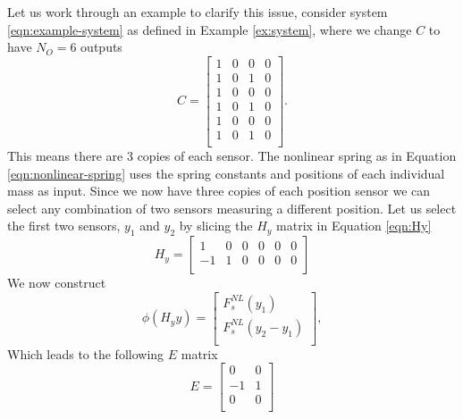 \begin{example}\label{ex:nonlinear-issue}
    Let us work through an example to clarify this issue, consider system \eqref{eqn:example-system} as defined in Example \ref{ex:system}, where we change $C$ to have $N_O=6$ outputs
    \begin{equation}\label{eqn:NL-ex-C-6out}
        C = 
        \begin{bmatrix}
            1 & 0 & 0 & 0 \\
            1 & 0 & 1 & 0 \\
            1 & 0 & 0 & 0 \\
            1 & 0 & 1 & 0 \\
            1 & 0 & 0 & 0 \\
            1 & 0 & 1 & 0 \\
        \end{bmatrix}.
    \end{equation}
    This means there are 3 copies of each sensor. The nonlinear spring as in Equation \eqref{eqn:nonlinear-spring} uses the spring constants and positions of each individual mass as input. Since we now have three copies of each position sensor we can select any combination of two sensors measuring a different position. Let us select the first two sensors, $y_1$ and $y_2$ by slicing the $H_y$ matrix in Equation \eqref{eqn:Hy}
    \begin{equation*}
        H_y = 
        \begin{bmatrix}
            1 & 0 & 0 & 0 & 0 & 0 \\
            -1 & 1 & 0 & 0 & 0 & 0 \\
        \end{bmatrix}
    \end{equation*}
    We now construct
    \begin{equation}\label{eqn:NL-ex-phi-6out}
        \phi(H_yy) = 
        \begin{bmatrix}
            F^{NL}_s(y_1) \\ F^{NL}_s(y_2 - y_1) \\
        \end{bmatrix},
    \end{equation}
    Which leads to the following $E$ matrix
    \begin{equation}\label{eqn:NL-ex-E-6out}
        E =
        \begin{bmatrix}
            0 & 0 \\
            -1 & 1 \\
            0 & 0 \\

\end{bmatrix}
\end{equation}
\end{example}
